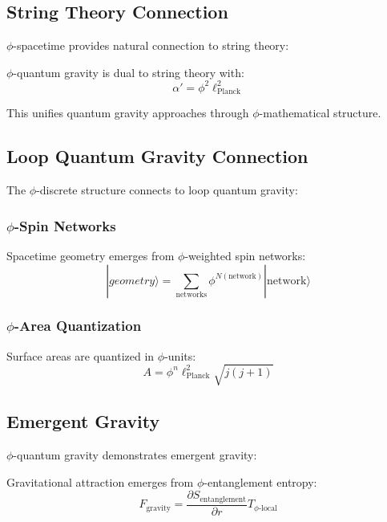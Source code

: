 \subsection{String Theory Connection}

$\phi$-spacetime provides natural connection to string theory:

\begin{theorem}
$\phi$-quantum gravity is dual to string theory with:
\begin{equation}
\alpha' = \phi^2 \ell_{\text{Planck}}^2
\label{eq:phi_string_scale}
\end{equation}
\end{theorem}

This unifies quantum gravity approaches through $\phi$-mathematical structure.

\subsection{Loop Quantum Gravity Connection}

The $\phi$-discrete structure connects to loop quantum gravity:

\subsubsection{$\phi$-Spin Networks}

Spacetime geometry emerges from $\phi$-weighted spin networks:
\begin{equation}
|geometry\rangle = \sum_{\text{networks}} \phi^{N(\text{network})} |\text{network}\rangle
\end{equation}

\subsubsection{$\phi$-Area Quantization}

Surface areas are quantized in $\phi$-units:
\begin{equation}
A = \phi^n \ell_{\text{Planck}}^2 \sqrt{j(j+1)}
\end{equation}

\subsection{Emergent Gravity}

$\phi$-quantum gravity demonstrates emergent gravity:

\begin{theorem}
Gravitational attraction emerges from $\phi$-entanglement entropy:
\begin{equation}
F_{\text{gravity}} = \frac{\partial S_{\text{entanglement}}}{\partial r} T_{\text{$\phi$-local}}
\label{eq:emergent_phi_gravity}
\end{equation}
\end{theorem}

